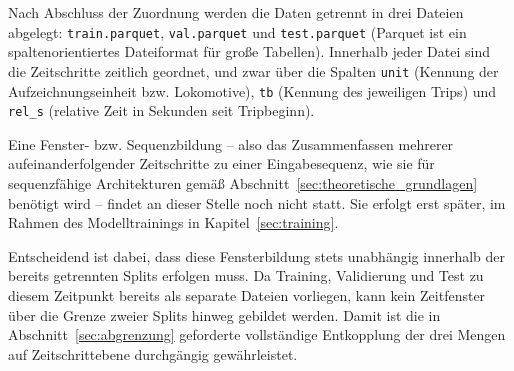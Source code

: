 Nach Abschluss der Zuordnung werden die Daten getrennt in drei Dateien abgelegt: \texttt{train.parquet}, \texttt{val.parquet} und \texttt{test.parquet} (Parquet ist ein spaltenorientiertes Dateiformat für große Tabellen). Innerhalb jeder Datei sind die Zeitschritte zeitlich geordnet, und zwar über die Spalten \texttt{unit} (Kennung der Aufzeichnungseinheit bzw. Lokomotive), \texttt{tb} (Kennung des jeweiligen Trips) und \texttt{rel\_s} (relative Zeit in Sekunden seit Tripbeginn).

Eine Fenster- bzw. Sequenzbildung -- also das Zusammenfassen mehrerer aufeinanderfolgender Zeitschritte zu einer Eingabesequenz, wie sie für sequenzfähige Architekturen gemäß Abschnitt~\ref{sec:theoretische_grundlagen} benötigt wird -- findet an dieser Stelle noch nicht statt. Sie erfolgt erst später, im Rahmen des Modelltrainings in Kapitel~\ref{sec:training}.

Entscheidend ist dabei, dass diese Fensterbildung stets unabhängig innerhalb der bereits getrennten Splits erfolgen muss. Da Training, Validierung und Test zu diesem Zeitpunkt bereits als separate Dateien vorliegen, kann kein Zeitfenster über die Grenze zweier Splits hinweg gebildet werden. Damit ist die in Abschnitt~\ref{sec:abgrenzung} geforderte vollständige Entkopplung der drei Mengen auf Zeitschrittebene durchgängig gewährleistet.